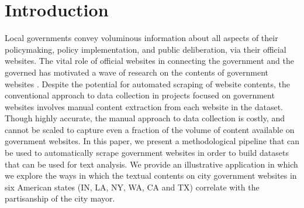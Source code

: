 \documentclass[11pt]{article}
\begin{document}
\thispagestyle{empty}
\doublespacing
\section{Introduction}


Local governments convey voluminous information about all aspects of their policymaking, policy implementation, and public deliberation, via their official websites. The vital role of official websites in connecting the government and the governed has motivated a wave of research on the contents of government websites \citep[e.g.,][]{grimmelikhuijsen2010transparency,wang2005evaluating,osman2014cobra}. Despite the potential for automated scraping of website contents, the conventional approach to data collection in projects focused on government websites involves manual content extraction from each website in the dataset. Though highly accurate, the manual approach to data collection is costly, and cannot be scaled to capture even a fraction of the volume of content available on government websites. In this paper, we present a methodological pipeline that can be used to automatically scrape government websites in order to build datasets that can be used for text analysis. We provide an illustrative application in which we explore the ways in which the textual contents on city government websites in six American states (IN, LA, NY, WA, CA and TX) correlate with the partisanship of the city mayor.
\end{document}
